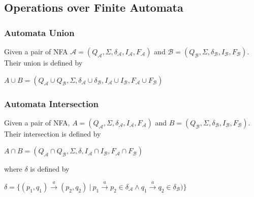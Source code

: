   \subsection{Operations over Finite Automata}
    \subsubsection{Automata Union}
    \label{defAUnion}
      Given a pair of NFA $\mathcal{A}=(Q_\mathcal{A},\Sigma,\delta_\mathcal{A},I_\mathcal{A},F_\mathcal{A})$ 
      and $\mathcal{B}=(Q_\mathcal{B},\Sigma,\delta_\mathcal{B},I_\mathcal{B},F_\mathcal{B})$. Their union is defined by
      \begin{description}
        \item $A \cup B=(Q_\mathcal{A}\cup Q_\mathcal{B},\Sigma,
            \delta_\mathcal{A}\cup\delta_\mathcal{B},I_\mathcal{A}\cup I_\mathcal{B},F_\mathcal{A}\cup F_\mathcal{B})$
      \end{description}
    
    \subsubsection{Automata Intersection}
    \label{defAInter}
      Given a pair of NFA, $A=(Q_\mathcal{A},\Sigma,\delta_\mathcal{A},I_\mathcal{A},F_\mathcal{A})$ 
      and $B=(Q_\mathcal{B},\Sigma,\delta_\mathcal{B},I_\mathcal{B},F_\mathcal{B})$. Their intersection is defined by
      \begin{description}
        \item $A \cap B=(Q_\mathcal{A}\cap Q_\mathcal{B},\Sigma,\delta,I_\mathcal{A}\cap I_\mathcal{B},F_\mathcal{A}\cap F_\mathcal{B})$\
      \end{description}
      where $\delta$ is defined by
      \begin{description}
        \item $\delta = 
        \{(p_1,q_1) \xrightarrow{a} (p_2,q_2)\ |\ p_1 \xrightarrow{a} p_2 \in \delta_\mathcal{A} \wedge q_1 \xrightarrow{a} q_2 \in \delta_\mathcal{B})\}$\
      \end{description}

